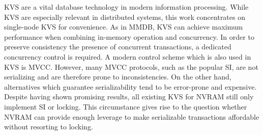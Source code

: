 \ac{KVS} are a vital database technology in modern information processing. While
\ac{KVS} are especially relevant in distributed systems, this work concentrates
on single-node \ac{KVS} for convenience. As in \ac{MMDB}, \ac{KVS} can achieve
maximum performance when combining in-memory operation and concurrency. In order
to preserve consistency the presence of concurrent transactions, a dedicated
concurrency control is required. A modern control scheme which is also used in
\ac{KVS} is \ac{MVCC}. However, many \ac{MVCC} protocols, such as the popular
\ac{SI}, are not serializing and are therefore prone to inconsistencies. On the
other hand, alternatives which guarantee serializability tend to be error-prone
and expensive. Despite having shown promising results, all existing \ac{KVS} for
\ac{NVRAM} still only implement \ac{SI} or locking. This circumstance gives rise
to the question whether \ac{NVRAM} can provide enough leverage to make
serializable transactions affordable without resorting to locking.
